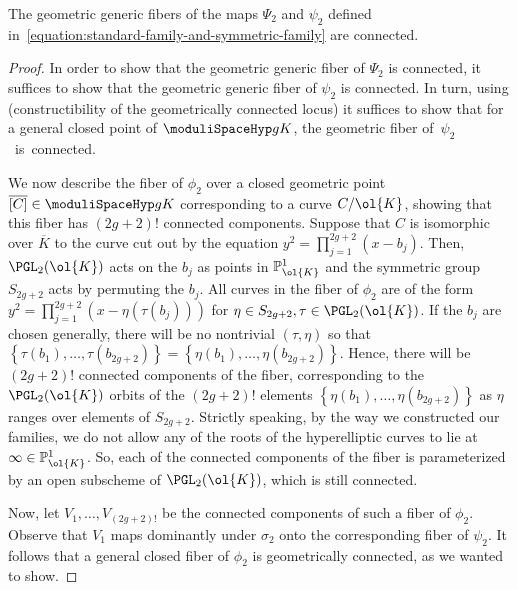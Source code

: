 \begin{lemma}
	\label{lemma:connected-generic-fiber}
	The geometric generic fibers of the maps $\Psi_2$ and $\psi_2$ defined in~\eqref{equation:standard-family-and-symmetric-family} are connected.
\end{lemma}
\begin{proof}
	In order to show that the geometric generic fiber of $\Psi_2$
	is connected, it suffices to show that the geometric generic fiber of $\psi_2$ is connected.
	In turn, using \cite[Book IV, Th\'eor\`eme 9.7.7(ii)]{EGA}
	(constructibility of the geometrically connected locus)
	it suffices to show that for a general closed point of
	$\moduliSpaceHyp g K$, the geometric fiber \mbox{of $\psi_2$
	is connected.}

	We now describe the fiber of $\phi_2$ over a closed
	geometric point $\overline{[C]} \in \moduliSpaceHyp g K$ corresponding to a curve $C/\ol{K}$, 
	showing that this fiber has $(2g+2)!$ connected components.
	Suppose that $C$ is isomorphic over $\overline K$
	to the curve cut out by the equation $y^2 = \prod_{j=1}^{2g+2} (x-b_j)$.
	Then, $\PGL_2(\ol{K})$ acts on the $b_j$ as points in $\mathbb{P}_{\ol{K}}^1$
	and the symmetric group $S_{2g+2}$ acts by permuting the $b_j$.
	All curves in the fiber of $\phi_2$ are of the form
	$y^2 = \prod_{j=1}^{2g+2} \left( x-\eta (\tau (b_j)) \right)$
	for $\eta \in S_{2g+2}, \tau \in \PGL_2(\ol{K})$.
	If the $b_j$ are chosen generally, there will be no nontrivial
	$(\tau,\eta)$ so that $\left\{ \tau(b_1), \ldots, \tau(b_{2g+2}) \right\}  = \left\{ \eta(b_1), \ldots, \eta(b_{2g+2}) \right\}$.
	Hence, there will be $(2g+2)!$ connected components of the fiber,
	corresponding to the $\PGL_2(\ol{K})$ orbits of the $(2g+2)!$ elements
	$\left\{ \eta(b_1), \ldots, \eta(b_{2g+2}) \right\}$ as $\eta$ ranges over elements
	of $S_{2g+2}$.
	Strictly speaking, by the way we constructed our families,
	we do not allow any of the roots of the hyperelliptic
	curves to lie at $\infty \in \mathbb{P}_{\ol{K}}^1$. 
	So, each of the
	connected components of the fiber is
	parameterized by an open subscheme of $\PGL_2(\ol{K})$, which is still connected.

	Now, let $V_1, \ldots, V_{(2g+2)!}$ be the connected components of
	such a fiber of $\phi_2$. Observe that $V_1$
	maps dominantly under $\sigma_2$ 
	onto the corresponding fiber of $\psi_2$.
		It follows that a general
	closed fiber of $\phi_2$ is geometrically connected,
	as we wanted to show.
\end{proof}

